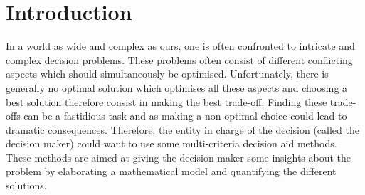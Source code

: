 \documentclass[conference,compsoc]{IEEEtran}
\begin{document}
\maketitle






%
\IEEEpeerreviewmaketitle



\section{Introduction}

In a world as wide and complex as ours, one is often confronted to intricate and complex decision problems. 
These problems often consist of different conflicting aspects which should simultaneously be optimised.
Unfortunately, there is generally no optimal solution which optimises all these aspects and choosing a best solution therefore consist in making the best trade-off. 
Finding these trade-offs can be a fastidious task and as making a non optimal choice could lead to dramatic consequences.
Therefore, the entity in charge of the decision (called the decision maker) could want to use some multi-criteria decision aid methods. These methods are aimed at giving the decision maker some insights about the problem by elaborating a mathematical model and quantifying the different solutions.

% 
% 
 
\end{document}
